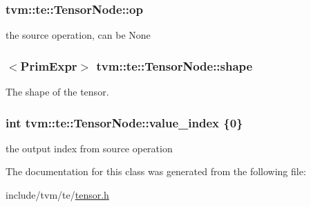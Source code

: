 \subsubsection[{\texorpdfstring{op}{op}}]{ tvm\+::te\+::\+Tensor\+Node\+::op}\hypertarget{classtvm_1_1te_1_1TensorNode_a64faab73896ac7e9dd8dc43110920c7c}{}\label{classtvm_1_1te_1_1TensorNode_a64faab73896ac7e9dd8dc43110920c7c}


the source operation, can be None 

\subsubsection[{\texorpdfstring{shape}{shape}}]{$<${\bf Prim\+Expr}$>$ tvm\+::te\+::\+Tensor\+Node\+::shape}\hypertarget{classtvm_1_1te_1_1TensorNode_a0ba732bc2def0d467854585752911351}{}\label{classtvm_1_1te_1_1TensorNode_a0ba732bc2def0d467854585752911351}


The shape of the tensor. 

\subsubsection[{\texorpdfstring{value\+\_\+index}{value_index}}]{\setlength{\rightskip}{0pt plus 5cm}int tvm\+::te\+::\+Tensor\+Node\+::value\+\_\+index \{0\}}\hypertarget{classtvm_1_1te_1_1TensorNode_aaf908a208cea7f27477c1c58ba605aa8}{}\label{classtvm_1_1te_1_1TensorNode_aaf908a208cea7f27477c1c58ba605aa8}


the output index from source operation 



The documentation for this class was generated from the following file\+:\begin{DoxyCompactItemize}
\item 
include/tvm/te/\hyperlink{tensor_8h}{tensor.\+h}\end{DoxyCompactItemize}
